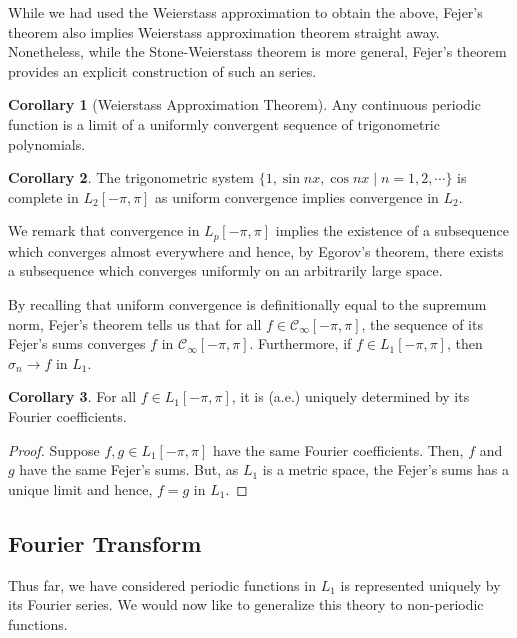 \documentclass[]{article}
\theoremstyle{definition}
\newtheorem{corollary}{Corollary}[theorem]
\theoremstyle{definition}
\begin{document}
While we had used the Weierstass approximation to obtain the above, Fejer's theorem 
also implies Weierstass approximation theorem straight away. Nonetheless, while 
the Stone-Weierstass theorem is more general, Fejer's theorem provides an explicit 
construction of such an series.

\begin{corollary}[Weierstass Approximation Theorem]
  Any continuous periodic function is a limit of a uniformly convergent sequence 
  of trigonometric polynomials.
\end{corollary}

\begin{corollary}
  The trigonometric system \(\{1, \sin nx, \cos nx \mid n = 1, 2, \cdots\}\) is 
  complete in \(L_2[-\pi, \pi]\) as uniform convergence implies convergence in \(L_2\).
\end{corollary}

We remark that convergence in \(L_p[-\pi, \pi]\) implies the existence of a subsequence which 
converges almost everywhere and hence, by Egorov's theorem, there exists a subsequence 
which converges uniformly on an arbitrarily large space.

By recalling that uniform convergence is definitionally equal to the supremum norm, 
Fejer's theorem tells us that for all \(f \in \mathcal{C}_\infty[-\pi, \pi]\), 
the sequence of its Fejer's sums converges \(f\) in \(\mathcal{C}_\infty[-\pi, \pi]\).
Furthermore, if \(f \in L_1[-\pi, \pi]\), then \(\sigma_n \to f\) in \(L_1\).

\begin{corollary}
  For all \(f \in L_1[-\pi, \pi]\), it is (a.e.) uniquely determined by its 
  Fourier coefficients. 
\end{corollary}
\begin{proof}
  Suppose \(f, g \in L_1[-\pi, \pi]\) have the same Fourier coefficients. Then,
  \(f\) and \(g\) have the same Fejer's sums. But, as \(L_1\) is a metric space, 
  the Fejer's sums has a unique limit and hence, \(f = g\) in \(L_1\).
\end{proof}

\subsection{Fourier Transform}

Thus far, we have considered periodic functions in \(L_1\) is represented uniquely 
by its Fourier series. We would now like to generalize this theory to non-periodic 
functions. 
\end{document}
